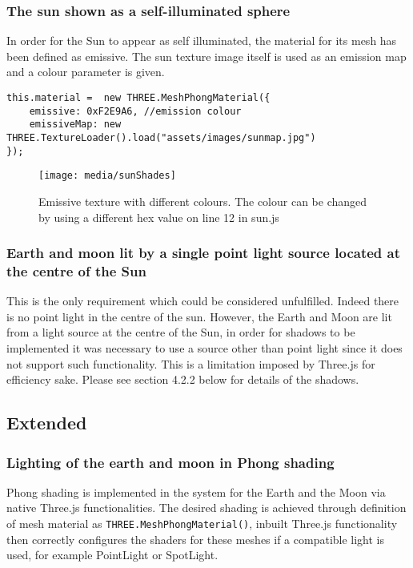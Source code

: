 \documentclass[titlepage]{article}
\begin{document}
\subsubsection{The sun shown as a self-illuminated sphere}
In order for the Sun to appear as self illuminated, the material for its mesh has been defined as emissive. The sun texture image itself is used as an emission map and a colour parameter is given. 
\begin{lstlisting}
this.material =  new THREE.MeshPhongMaterial({
    emissive: 0xF2E9A6, //emission colour
    emissiveMap: new THREE.TextureLoader().load("assets/images/sunmap.jpg")
});
\end{lstlisting}
\begin{figure}[h!]
                \centering
                \texttt{[image: media/sunShades]}
                \caption{Emissive texture with different colours. The colour can be changed by using a different hex value on line 12 in sun.js}
\end{figure}

\subsubsection{Earth and moon lit by a single point light source located at the centre of the Sun}
This is the only requirement which could be considered unfulfilled. Indeed there is no point light in the centre of the sun. However, the Earth and Moon are lit from a light source at the centre of the Sun, in order for shadows to be implemented it was necessary to use a source other than point light since it does not support such functionality. This is a limitation imposed by Three.js for efficiency sake. Please see section 4.2.2 below for details of the shadows.

\subsection{Extended}

\subsubsection{Lighting of the earth and moon in Phong shading}
Phong shading is implemented in the system for the Earth and the Moon via native Three.js functionalities. The desired shading is achieved through definition of mesh material as \texttt{THREE.MeshPhongMaterial()}, inbuilt Three.js functionality then correctly configures the shaders for these meshes if a compatible light is used, for example PointLight or SpotLight.
\end{document}
